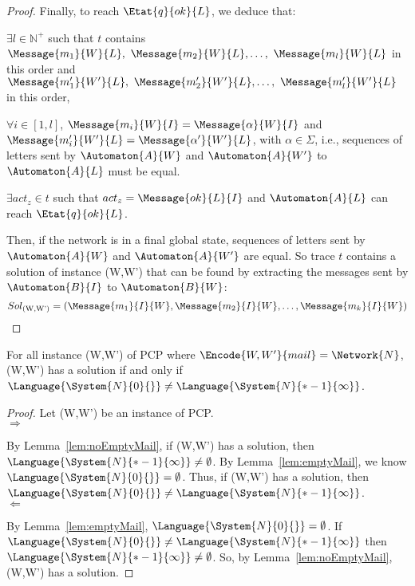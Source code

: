 \begin{proof}
Finally, to reach $\Etat{q}{ok}{L}$, we deduce that: 
\begin{myitemize}
\item $\exists l \in \mathbb{N}^+$ such that $t$ contains $\Message{m_1}{W}{L},~\Message{m_2}{W}{L},\dots,~\Message{m_l}{W}{L}$ in this order and $\Message{m_1'}{W'}{L},~\Message{m_2'}{W'}{L},\dots,~\Message{m_l'}{W'}{L}$ in this order,
\item $\forall i \in [1,l]$, $\Message{m_i}{W}{I} = \Message{\alpha}{W}{I}$ and $\Message{m_i'}{W'}{L} = \Message{\alpha'}{W'}{L}$, with $\alpha \in \Sigma$, i.e., sequences of letters sent by $\Automaton{A}{W}$ and $\Automaton{A}{W'}$ to $\Automaton{A}{L}$ must be equal. 
\item $\exists act_z \in t$ such that $act_z = \Message{ok}{L}{I}$ and $\Automaton{A}{L}$ can reach $\Etat{q}{ok}{L}$. 
\end{myitemize}

Then, if the network is in a final global state, sequences of letters sent by $\Automaton{A}{W}$ and $\Automaton{A}{W'}$ are equal. So trace $t$ contains a solution of instance (W,W') that can be found by extracting the messages sent by $\Automaton{B}{I}$ to $\Automaton{B}{W}$: 
$$Sol_{\text{(W,W')}}  = (\Message{m_1}{I}{W}, \Message{m_2}{I}{W}, \dots, \Message{m_k}{I}{W}) $$
\end{proof}

\begin{lem}%
For all instance (W,W') of PCP where $\Encode{W,W'}{mail}= \Network{N}$, (W,W') has a solution if and only if $\Language{\System{N}{0}{}} \neq \Language{\System{N}{*-1}{\infty}}$. 
\end{lem}

\begin{proof}
Let (W,W') be an instance of PCP. \\
$\Rightarrow$ 

By Lemma~\ref{lem:noEmptyMail}, if (W,W') has a solution, then 
$\Language{\System{N}{*-1}{\infty}} \neq \emptyset$.  
By Lemma~\ref{lem:emptyMail}, we know 
$\Language{\System{N}{0}{}} = \emptyset$. Thus, if (W,W') has a solution, then \\
$\Language{\System{N}{0}{}} \neq \Language{\System{N}{*-1}{\infty}}$. \\
$\Leftarrow$ 

By Lemma~\ref{lem:emptyMail}, 
$\Language{\System{N}{0}{}} = \emptyset$. 
 If  
$\Language{\System{N}{0}{}} \neq \Language{\System{N}{*-1}{\infty}}$
 then 
$\Language{\System{N}{*-1}{\infty}} \neq \emptyset$. So, by Lemma~\ref{lem:noEmptyMail}, (W,W') has a solution.  
\end{proof}



